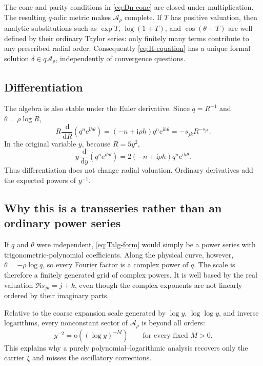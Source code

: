 \documentclass[11pt,oneside]{article}
\numberwithin{equation}{section}
\theoremstyle{plain}
\theoremstyle{definition}
\theoremstyle{remark}
\newcommand{\e}{\mathrm e}
\newcommand{\ii}{\mathrm i}
\newcommand{\dd}{\,\mathrm d}
\newcommand{\littleo}{\mathrm o}
\newcommand{\Talg}{\mathscr A_{\rho}}
\begin{document}
The cone and parity conditions in \cref{eq:Dn-cone} are closed under
multiplication.  The resulting \(q\)-adic metric makes \(\Talg\) complete.
If \(T\) has positive valuation, then analytic substitutions such as
\(\exp T\), \(\log(1+T)\), and \(\cos(\theta+T)\) are well defined by their
ordinary Taylor series: only finitely many terms contribute to any prescribed
radial order.  Consequently \cref{eq:H-equation} has a unique formal solution
\(\delta\in q\Talg\), independently of convergence questions.

\subsection{Differentiation}

The algebra is also stable under the Euler derivative.  Since
\(q=R^{-1}\) and \(\theta=\rho\log R\),
\begin{equation}\label{eq:euler-action}
 R\frac{\dd}{\dd R}
 \left(q^n\e^{\ii h\theta}\right)
 =(-n+\ii\rho h)q^n\e^{\ii h\theta}
 =-s_{jk}R^{-s_{jk}}.
\end{equation}
In the original variable \(y\), because \(R=5y^2\),
\begin{equation}\label{eq:y-euler-action}
 y\frac{\dd}{\dd y}
 \left(q^n\e^{\ii h\theta}\right)
 =2(-n+\ii\rho h)q^n\e^{\ii h\theta}.
\end{equation}
Thus differentiation does not change radial valuation.  Ordinary derivatives
add the expected powers of \(y^{-1}\).

\subsection{Why this is a transseries rather than an ordinary power series}

If \(q\) and \(\theta\) were independent, \cref{eq:Talg-form} would simply
be a power series with trigonometric-polynomial coefficients.  Along the
physical curve, however,
\(
 \theta=-\rho\log q
\), so every Fourier factor is a complex power of \(q\).
The scale is therefore a finitely generated grid of complex powers.  It is
well based by the real valuation \(\Re s_{jk}=j+k\), even though the complex
exponents are not linearly ordered by their imaginary parts.

Relative to the coarse expansion scale generated by
\(\log y\), \(\log\log y\), and inverse logarithms, every nonconstant sector
of \(\Talg\) is beyond all orders:
\[
 y^{-2}=\littleo\!\left((\log y)^{-M}\right)
 \qquad\text{for every fixed }M>0.
\]
This explains why a purely polynomial--logarithmic analysis recovers only
the carrier \(\xi\) and misses the oscillatory corrections.
\end{document}
